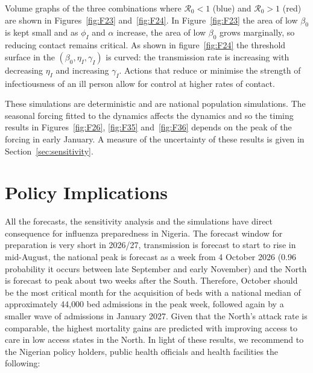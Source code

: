 \documentclass[12pt,a4paper]{article}
\theoremstyle{definition}
\theoremstyle{remark}
\begin{document}
Volume graphs of the three combinations where $\mathcal{R}_0 < 1$ (blue) and $\mathcal{R}_0 > 1$ (red) are shown in Figures~\ref{fig:F23} and~\ref{fig:F24}. In Figure~\ref{fig:F23} the area of low $\beta_0$ is kept small and as $\phi_I$ and $\alpha$ increase, the area of low $\beta_0$ grows marginally, so reducing contact remains critical. As shown in figure~\ref{fig:F24} the threshold surface in the $(\beta_0, \eta_I, \gamma_I)$ is curved: the transmission rate is increasing with decreasing $\eta_I$ and increasing $\gamma_I$. Actions that reduce or minimise the strength of infectiousness of an ill person allow for control at higher rates of contact.


These simulations are deterministic and are national population simulations. The seasonal forcing fitted to the dynamics affects the dynamics and so the timing results in Figures~\ref{fig:F26}, \ref{fig:F35} and~\ref{fig:F36} depends on the peak of the forcing in early January. A measure of the uncertainty of these results is given in Section~\ref{sec:sensitivity}.



\section{Policy Implications}\label{sec:policy}

All the forecasts, the sensitivity analysis and the simulations have direct consequence for influenza preparedness in Nigeria. The forecast window for preparation is very short in 2026/27, transmission is forecast to start to rise in mid-August, the national peak is forecast as a week from 4 October 2026 (0.96 probability it occurs between late September and early November) and the North is forecast to peak about two weeks after the South. Therefore, October should be the most critical month for the acquisition of beds with a national median of approximately 44{,}000 bed admissions in the peak week, followed again by a smaller wave of admissions in January 2027. Given that the North's attack rate is comparable, the highest mortality gains are predicted with improving access to care in low access states in the North. In light of these results, we recommend to the Nigerian policy holders, public health officials and health facilities the following:
\end{document}
